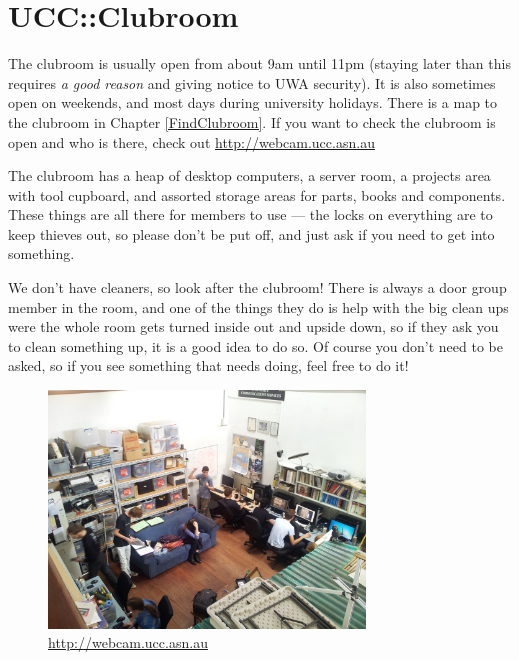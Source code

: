 \chapter{UCC::Clubroom}

\null
The clubroom is usually open from about 9am until 11pm (staying later than this requires \emph{a good reason} and giving notice to UWA security). It is also sometimes open on weekends, and most days during university holidays. There is a map to the clubroom in Chapter \ref{FindClubroom}. If you want to check the clubroom is open and who is there, check out \url{http://webcam.ucc.asn.au}

The clubroom has a heap of desktop computers, a server room, a projects area with tool cupboard, and assorted storage areas for parts, books and components. These things are all there for members to use --- the locks on everything are to keep thieves out, so please don't be put off, and just ask if you need to get into something.

We don't have cleaners, so look after the clubroom! There is always a door group member in the room, and one of the things they do is help with the big clean ups were the whole room gets turned inside out and upside down, so if they ask you to clean something up, it is a good idea to do so. Of course you don't need to be asked, so if you see something that needs doing, feel free to do it!

\begin{figure}[H]
	\centering
	\includegraphics[width=0.75\textwidth]{figures/2014-04-2712-31-56.jpg}
	\caption{\url{http://webcam.ucc.asn.au}}
	\label{webcam.jpg}
\end{figure}
